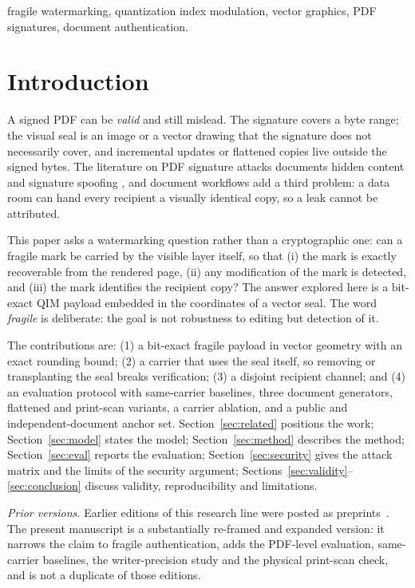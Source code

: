 \documentclass[journal]{IEEEtran}
\begin{document}
\begin{IEEEkeywords}
fragile watermarking, quantization index modulation, vector graphics, PDF signatures, document authentication.
\end{IEEEkeywords}

\section{Introduction}
A signed PDF can be \emph{valid} and still mislead. The signature covers a byte range; the visual seal is an image or a vector drawing that the signature does not necessarily cover, and incremental updates or flattened copies live outside the signed bytes. The literature on PDF signature attacks documents hidden content \cite{mainka2021} and signature spoofing \cite{mladenov2019}, and document workflows add a third problem: a data room can hand every recipient a visually identical copy, so a leak cannot be attributed.

This paper asks a watermarking question rather than a cryptographic one: can a fragile mark be carried by the visible layer itself, so that (i) the mark is exactly recoverable from the rendered page, (ii) any modification of the mark is detected, and (iii) the mark identifies the recipient copy? The answer explored here is a bit-exact QIM payload embedded in the coordinates of a vector seal. The word \emph{fragile} is deliberate: the goal is not robustness to editing but detection of it.

The contributions are: (1) a bit-exact fragile payload in vector geometry with an exact rounding bound; (2) a carrier that uses the seal itself, so removing or transplanting the seal breaks verification; (3) a disjoint recipient channel; and (4) an evaluation protocol with same-carrier baselines, three document generators, flattened and print-scan variants, a carrier ablation, and a public and independent-document anchor set. Section~\ref{sec:related} positions the work; Section~\ref{sec:model} states the model; Section~\ref{sec:method} describes the method; Section~\ref{sec:eval} reports the evaluation; Section~\ref{sec:security} gives the attack matrix and the limits of the security argument; Sections~\ref{sec:validity}--\ref{sec:conclusion} discuss validity, reproducibility and limitations.

\emph{Prior versions.} Earlier editions of this research line were posted as preprints~\cite{baienko2026preprint}. The present manuscript is a substantially re-framed and expanded version: it narrows the claim to fragile authentication, adds the PDF-level evaluation, same-carrier baselines, the writer-precision study and the physical print-scan check, and is not a duplicate of those editions.
\end{document}
